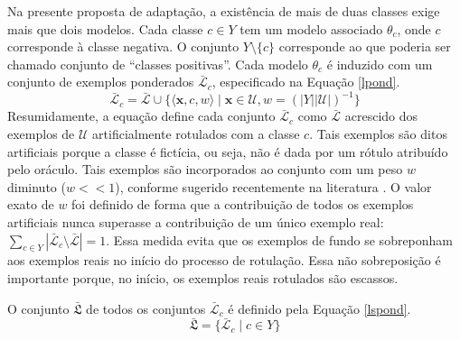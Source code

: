 Na presente proposta de adaptação, a existência de mais de duas classes exige mais que dois modelos.
Cada classe $c \in Y$ tem um modelo associado $\theta_c$, onde $c$ corresponde à classe negativa.
O conjunto $Y \setminus \{c\}$ corresponde ao que poderia ser chamado conjunto de ``classes positivas''.
Cada modelo $\theta_c$ é induzido com um conjunto de exemplos ponderados $\mathcal{\bar{L}}_c$, especificado na Equação \ref{lpond}.
\begin{equation}\label{lpond}
\mathcal{\bar{L}}_c = \mathcal{\bar{L}} \cup \{\langle \bm{x},c,w \rangle \mid  \bm{x}\in \mathcal{U}, w=(|Y||\mathcal{U}|)^{-1}\}
\end{equation}
Resumidamente, a equação define cada conjunto $\mathcal{\bar{L}}_c$ como $\mathcal{\bar{L}}$ acrescido dos exemplos de $\mathcal{U}$ artificialmente rotulados com a classe $c$.
Tais exemplos são ditos artificiais porque a classe é fictícia, ou seja, não é dada por um rótulo atribuído pelo oráculo.
Tais exemplos são incorporados ao conjunto com um peso $w$ diminuto ($w << 1$), conforme sugerido recentemente na literatura .
O valor exato de $w$ foi definido de forma que a contribuição de todos os exemplos artificiais nunca superasse a contribuição de um único exemplo real: $\sum\limits_{c \in Y}|\mathcal{\bar{L}}_c \setminus \mathcal{\bar{L}}| = 1$. 
Essa medida evita que os exemplos de fundo se sobreponham aos exemplos reais no início do processo de rotulação.
Essa não sobreposição é importante porque, no início, os exemplos reais rotulados são escassos.

O conjunto $\mathfrak{\bar{L}}$ de todos os conjuntos $\mathcal{\bar{L}}_c$ é definido pela Equação \ref{lspond}.
\begin{equation}\label{lspond}
\mathfrak{\bar{L}} = \{\mathcal{\bar{L}}_c \mid c \in Y\}
\end{equation}

